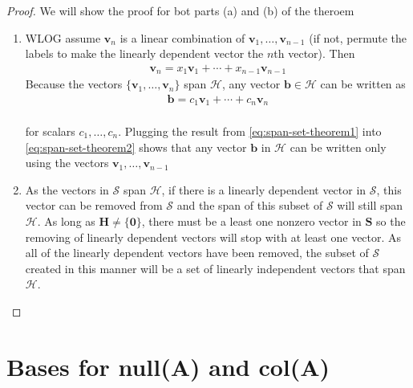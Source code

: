 \documentclass[
]{book}
\theoremstyle{definition}
\theoremstyle{definition}
\theoremstyle{definition}
\theoremstyle{definition}
\theoremstyle{remark}
\begin{document}
\begin{proof}

We will show the proof for bot parts (a) and (b) of the theroem

\begin{enumerate}
\def\labelenumi{\alph{enumi})}
\item
  WLOG assume \(\mathbf{v}_n\) is a linear combination of \(\mathbf{v}_1, \ldots, \mathbf{v}_{n-1}\) (if not, permute the labels to make the linearly dependent vector the \(n\)th vector). Then
  \[
  \begin{aligned}
  \mathbf{v}_n = x_1 \mathbf{v}_1 + \cdots + x_{n-1} \mathbf{v}_{n-1}
  \end{aligned}
  \label{eq:span-set-theorem1}
  \]
  Because the vectors \(\{\mathbf{v}_1, \ldots, \mathbf{v}_n\}\) span \(\mathcal{H}\), any vector \(\mathbf{b}\in \mathcal{H}\) can be written as
  \[
  \begin{aligned}
  \mathbf{b} = c_1 \mathbf{v}_1 + \cdots + c_{n} \mathbf{v}_{n}
  \end{aligned}
  \label{eq:span-set-theorem2}
  \]\\
  for scalars \(c_1, \ldots, c_n\). Plugging the result from \eqref{eq:span-set-theorem1} into \eqref{eq:span-set-theorem2} shows that any vector \(\mathbf{b}\) in \(\mathcal{H}\) can be written only using the vectors \(\mathbf{v}_1, \ldots, \mathbf{v}_{n-1}\)
\item
  As the vectors in \(\mathcal{S}\) span \(\mathcal{H}\), if there is a linearly dependent vector in \(\mathcal{S}\), this vector can be removed from \(\mathcal{S}\) and the span of this subset of \(\mathcal{S}\) will still span \(\mathcal{H}\). As long as \(\mathbf{H} \neq \{\mathbf{0}\}\), there must be a least one nonzero vector in \(\mathbf{S}\) so the removing of linearly dependent vectors will stop with at least one vector. As all of the linearly dependent vectors have been removed, the subset of \(\mathcal{S}\) created in this manner will be a set of linearly independent vectors that span \(\mathcal{H}\).
\end{enumerate}

\end{proof}

\hypertarget{bases-for-nullmathbfa-and-colmathbfa}{%
\section{\texorpdfstring{Bases for null(\(\mathbf{A}\)) and col(\(\mathbf{A}\))}{Bases for null(\textbackslash mathbf\{A\}) and col(\textbackslash mathbf\{A\})}}\label{bases-for-nullmathbfa-and-colmathbfa}}
\end{document}
